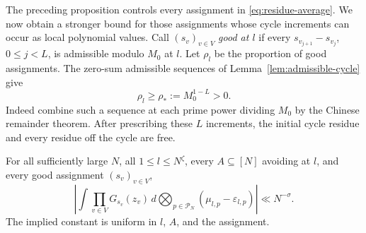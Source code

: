 The preceding proposition controls every assignment in
\eqref{eq:residue-average}.  We now obtain a stronger bound for those
assignments whose cycle increments can occur as local polynomial values.
Call $(s_v)_{v\in V}$ \emph{good at $l$} if every
$s_{v_{j+1}}-s_{v_j}$, $0\le j<L$, is admissible modulo $M_0$ at $l$.
Let $\rho_l$ be the proportion of good assignments.  The zero-sum
admissible sequences of Lemma~\ref{lem:admissible-cycle} give
\begin{equation}\label{eq:good-proportion}
 \rho_l\ge\rho_*:=M_0^{1-L}>0.
\end{equation}
Indeed combine such a sequence at each prime power dividing $M_0$ by the
Chinese remainder theorem.  After prescribing these $L$ increments, the
initial cycle residue and every residue off the cycle are free.

\begin{proposition}
\label{prop:descent-cancellation}
For all sufficiently large $N$, all $1\le l\le N^\zeta$, every
$A\subseteq[N]$ avoiding at $l$, and every good assignment $(s_v)_{v\in V}$,
\begin{equation}\label{eq:descent-cancellation}
 \left|\int\prod_{v\in V}G_{s_v}(z_v)\,
       d\bigotimes_{p\in\mathcal P_N}(\mu_{l,p}-\varepsilon_{l,p})\right|
       \ll N^{-\sigma}.
\end{equation}
The implied constant is uniform in $l$, $A$, and the assignment.
\end{proposition}

